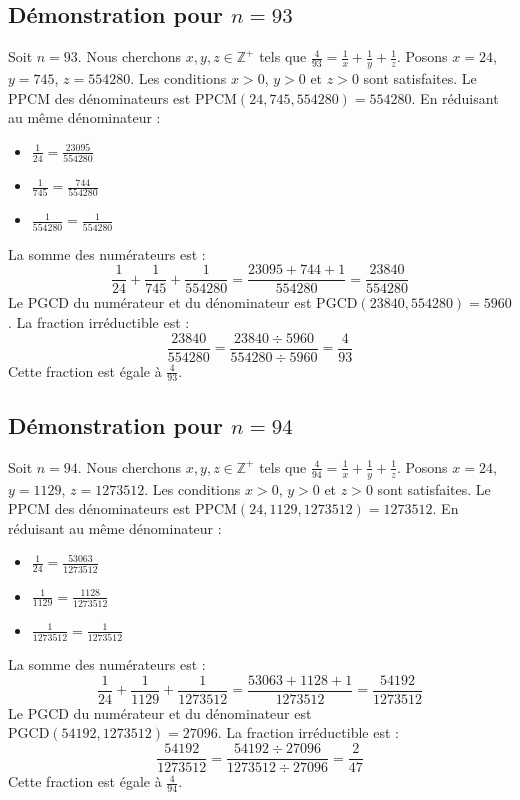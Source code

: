\documentclass[11pt,a4paper]{article}
\begin{document}
\subsection{Démonstration pour $n = 93$}
Soit $n = 93$. Nous cherchons $x, y, z \in \mathbb{Z}^{+}$ tels que $\frac{4}{93} = \frac{1}{x} + \frac{1}{y} + \frac{1}{z}$.
Posons $x = 24$, $y = 745$, $z = 554280$.
Les conditions $x > 0$, $y > 0$ et $z > 0$ sont satisfaites.
Le PPCM des dénominateurs est $\text{PPCM}(24, 745, 554280) = 554280$.
En réduisant au même dénominateur :
\begin{itemize}
    \item $\frac{1}{24} = \frac{23095}{554280}$
    \item $\frac{1}{745} = \frac{744}{554280}$
    \item $\frac{1}{554280} = \frac{1}{554280}$
\end{itemize}
La somme des numérateurs est :
$$ \frac{1}{24} + \frac{1}{745} + \frac{1}{554280} = \frac{23095 + 744 + 1}{554280} = \frac{23840}{554280} $$
Le PGCD du numérateur et du dénominateur est $\text{PGCD}(23840, 554280) = 5960$.
La fraction irréductible est :
$$ \frac{23840}{554280} = \frac{23840 \div 5960}{554280 \div 5960} = \frac{4}{93} $$
Cette fraction est égale à $\frac{4}{93}$.

\subsection{Démonstration pour $n = 94$}
Soit $n = 94$. Nous cherchons $x, y, z \in \mathbb{Z}^{+}$ tels que $\frac{4}{94} = \frac{1}{x} + \frac{1}{y} + \frac{1}{z}$.
Posons $x = 24$, $y = 1129$, $z = 1273512$.
Les conditions $x > 0$, $y > 0$ et $z > 0$ sont satisfaites.
Le PPCM des dénominateurs est $\text{PPCM}(24, 1129, 1273512) = 1273512$.
En réduisant au même dénominateur :
\begin{itemize}
    \item $\frac{1}{24} = \frac{53063}{1273512}$
    \item $\frac{1}{1129} = \frac{1128}{1273512}$
    \item $\frac{1}{1273512} = \frac{1}{1273512}$
\end{itemize}
La somme des numérateurs est :
$$ \frac{1}{24} + \frac{1}{1129} + \frac{1}{1273512} = \frac{53063 + 1128 + 1}{1273512} = \frac{54192}{1273512} $$
Le PGCD du numérateur et du dénominateur est $\text{PGCD}(54192, 1273512) = 27096$.
La fraction irréductible est :
$$ \frac{54192}{1273512} = \frac{54192 \div 27096}{1273512 \div 27096} = \frac{2}{47} $$
Cette fraction est égale à $\frac{4}{94}$.
\end{document}
